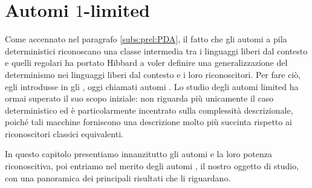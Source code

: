 \chapter{Automi \texorpdfstring{$1$}{1}-limited}\label{cha:a1l}
Come accennato nel paragrafo \ref{subs:prel:PDA}, il fatto che gli automi a pila deterministici riconoscano una classe intermedia tra i linguaggi liberi dal contesto e quelli regolari ha portato Hibbard a voler definire una generalizzazione del determinismo nei linguaggi liberi dal contesto e i loro riconoscitori. Per fare ciò, egli introdusse in \cite{Hibbard:67:CFdet} gli , oggi chiamati automi . Lo studio degli automi limited ha ormai superato il suo scopo iniziale: non riguarda più unicamente il caso deterministico ed è particolarmente incentrato sulla complessità descrizionale, poiché tali macchine forniscono una descrizione molto più succinta rispetto ai riconoscitori classici equivalenti.

In questo capitolo presentiamo innanzitutto gli automi  e la loro potenza riconoscitiva, poi entriamo nel merito degli automi , il nostro oggetto di studio, con una panoramica dei principali risultati che li riguardano.



